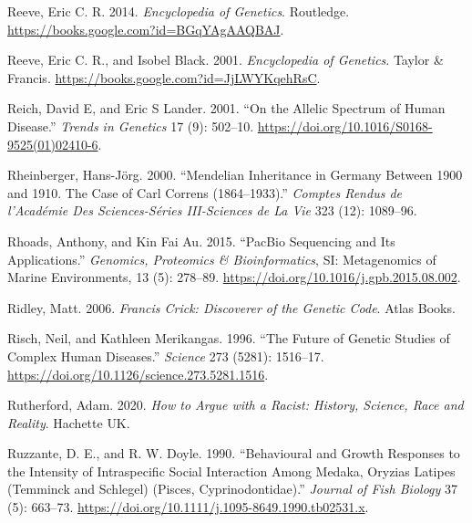 \documentclass[
]{book}
\newlength{\cslhangindent}
\newlength{\cslentryspacingunit} %
\newenvironment{CSLReferences}[2] %
 {%
  \setlength{\parindent}{0pt}
  \ifodd #1
  \let\oldpar\par
  \def\par{\hangindent=\cslhangindent\oldpar}
  \fi
  \setlength{\parskip}{#2\cslentryspacingunit}
 }%
 {}
\begin{document}
\begin{CSLReferences}{1}{0}
\leavevmode{}%
Reeve, Eric C. R. 2014. \emph{Encyclopedia of {Genetics}}. {Routledge}. \url{https://books.google.com?id=BGqYAgAAQBAJ}.

\leavevmode{}%
Reeve, Eric C. R., and Isobel Black. 2001. \emph{Encyclopedia of {Genetics}}. {Taylor \& Francis}. \url{https://books.google.com?id=JjLWYKqehRsC}.

\leavevmode{}%
Reich, David E, and Eric S Lander. 2001. {``On the Allelic Spectrum of Human Disease.''} \emph{Trends in Genetics} 17 (9): 502--10. \url{https://doi.org/10.1016/S0168-9525(01)02410-6}.

\leavevmode{}%
Rheinberger, Hans-Jörg. 2000. {``Mendelian Inheritance in {Germany} Between 1900 and 1910. {The} Case of {Carl Correns} (1864--1933).''} \emph{Comptes Rendus de l'Académie Des Sciences-Séries III-Sciences de La Vie} 323 (12): 1089--96.

\leavevmode{}%
Rhoads, Anthony, and Kin Fai Au. 2015. {``{PacBio Sequencing} and {Its Applications}.''} \emph{Genomics, Proteomics \& Bioinformatics}, {SI}: {Metagenomics} of {Marine Environments}, 13 (5): 278--89. \url{https://doi.org/10.1016/j.gpb.2015.08.002}.

\leavevmode{}%
Ridley, Matt. 2006. \emph{Francis {Crick}: Discoverer of the Genetic Code}. {Atlas Books}.

\leavevmode{}%
Risch, Neil, and Kathleen Merikangas. 1996. {``The {Future} of {Genetic Studies} of {Complex Human Diseases}.''} \emph{Science} 273 (5281): 1516--17. \url{https://doi.org/10.1126/science.273.5281.1516}.

\leavevmode{}%
Rutherford, Adam. 2020. \emph{How to Argue with a Racist: {History}, Science, Race and Reality}. {Hachette UK}.

\leavevmode{}%
Ruzzante, D. E., and R. W. Doyle. 1990. {``Behavioural and Growth Responses to the Intensity of Intraspecific Social Interaction Among Medaka, {Oryzias} Latipes ({Temminck} and {Schlegel}) ({Pisces}, {Cyprinodontidae}).''} \emph{Journal of Fish Biology} 37 (5): 663--73. \url{https://doi.org/10.1111/j.1095-8649.1990.tb02531.x}.


\end{CSLReferences}
\end{document}
